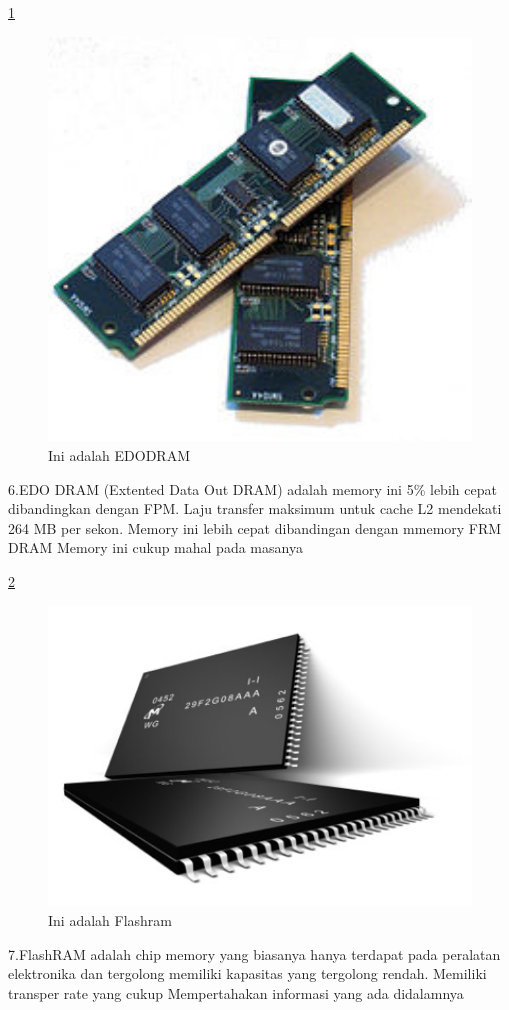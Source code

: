 \ref{EDODRAM}
  \begin{figure}[ht]
  \centerline{\includegraphics[width=1\textwidth]{figures/EDODRAM.jpg}}
  \caption{Ini adalah EDODRAM}
  \label{EDODRAM}
  \end{figure}
6.EDO DRAM (Extented Data Out DRAM) adalah memory ini 5\% lebih cepat dibandingkan dengan FPM. Laju transfer maksimum untuk cache L2 mendekati 264 MB per sekon.
    \-Memory ini lebih cepat dibandingan dengan mmemory FRM DRAM
    \-Memory ini cukup mahal pada masanya

\ref{Flashram}
  \begin{figure}[ht]
  \centerline{\includegraphics[width=1\textwidth]{figures/Flashram.jpg}}
  \caption{Ini adalah Flashram}
  \label{Flashram}
  \end{figure}
7.FlashRAM adalah chip memory yang biasanya hanya terdapat pada peralatan elektronika dan tergolong memiliki kapasitas yang tergolong rendah.
    \-Memiliki transper rate yang cukup
    \-Mempertahakan informasi yang ada didalamnya

